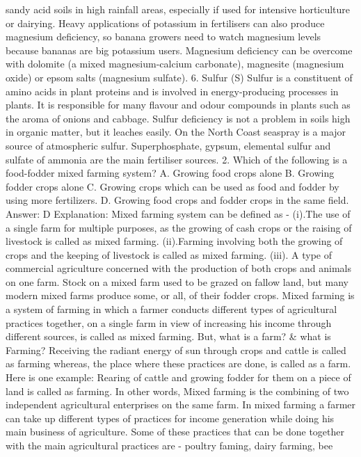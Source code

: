 sandy acid soils in high rainfall areas, especially if used for intensive
horticulture or dairying. Heavy applications of potassium in
fertilisers can also produce magnesium deficiency, so banana
growers need to watch magnesium levels because bananas are big
potassium users.
Magnesium deficiency can be overcome with dolomite (a mixed
magnesium-calcium carbonate), magnesite (magnesium oxide) or
epsom salts (magnesium sulfate).
6. Sulfur (S)
Sulfur is a constituent of amino acids in plant proteins and is
involved in energy-producing processes in plants. It is responsible
for many flavour and odour compounds in plants such as the aroma of
onions and cabbage.
Sulfur deficiency is not a problem in soils high in organic matter, but
it leaches easily. On the North Coast seaspray is a major source of
atmospheric sulfur. Superphosphate, gypsum, elemental sulfur and
sulfate of ammonia are the main fertiliser sources.
2. Which of the following is a food-fodder mixed farming
system?
A. Growing food crops alone
B. Growing fodder crops alone
C. Growing crops which can be used as food and fodder by using
more fertilizers.
D. Growing food crops and fodder crops in the same field.
Answer: D
Explanation: Mixed farming system can be defined as -
(i).The use of a single farm for multiple purposes, as the growing of
cash crops or the raising of livestock is called as mixed farming.
(ii).Farming involving both the growing of crops and the keeping of
livestock is called as mixed farming.
(iii). A type of commercial agriculture concerned with the production
of both crops and animals on one farm. Stock on a mixed farm used
to be grazed on fallow land, but many modern mixed farms produce
some, or all, of their fodder crops.
Mixed farming is a system of farming in which a farmer conducts
different types of agricultural practices together, on a single farm
in view of increasing his income through different sources, is called
as mixed farming. But, what is a farm? & what is Farming? Receiving
the radiant energy of sun through crops and cattle is called as
farming whereas, the place where these practices are done, is called
as a farm. Here is one example: Rearing of cattle and growing fodder
for them on a piece of land is called as farming. In other words,
Mixed farming is the combining of two independent agricultural
enterprises on the same farm.
In mixed farming a farmer can take up different types of practices
for income generation while doing his main business of agriculture.
Some of these practices that can be done together with the main
agricultural practices are - poultry faming, dairy farming, bee

